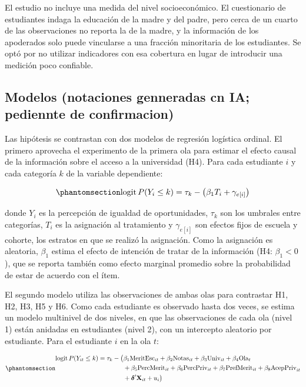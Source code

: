 \documentclass[
  spanish,
  a4paper,
  oneside]{scrbook}
\begin{document}
El estudio no incluye una medida del nivel socioeconómico. El
cuestionario de estudiantes indaga la educación de la madre y del padre,
pero cerca de un cuarto de las observaciones no reporta la de la madre,
y la información de los apoderados solo puede vincularse a una fracción
minoritaria de los estudiantes. Se optó por no utilizar indicadores con
esa cobertura en lugar de introducir una medición poco confiable.

\subsection{Modelos (notaciones genneradas cn IA; pediennte de
confirmacion)}\label{modelos-notaciones-genneradas-cn-ia-pediennte-de-confirmacion}

Las hipótesis se contrastan con dos modelos de regresión logística
ordinal. El primero aprovecha el experimento de la primera ola para
estimar el efecto causal de la información sobre el acceso a la
universidad (H4). Para cada estudiante \(i\) y cada categoría \(k\) de
la variable dependiente:

\begin{equation}\protect\phantomsection\label{eq-modelo1}{
\text{logit}\,P(Y_i \le k) = \tau_k - \left(\beta_1 T_i + \gamma_{e[i]}\right)
}\end{equation}

donde \(Y_i\) es la percepción de igualdad de oportunidades, \(\tau_k\)
son los umbrales entre categorías, \(T_i\) es la asignación al
tratamiento y \(\gamma_{e[i]}\) son efectos fijos de escuela y cohorte,
los estratos en que se realizó la asignación. Como la asignación es
aleatoria, \(\beta_1\) estima el efecto de intención de tratar de la
información (H4: \(\beta_1 < 0\)), que se reporta también como efecto
marginal promedio sobre la probabilidad de estar de acuerdo con el ítem.

El segundo modelo utiliza las observaciones de ambas olas para
contrastar H1, H2, H3, H5 y H6. Como cada estudiante es observado hasta
dos veces, se estima un modelo multinivel de dos niveles, en que las
observaciones de cada ola (nivel 1) están anidadas en estudiantes (nivel
2), con un intercepto aleatorio por estudiante. Para el estudiante \(i\)
en la ola \(t\):

\begin{equation}\protect\phantomsection\label{eq-modelo2}{
\begin{aligned}
\text{logit}\,P(Y_{it} \le k) = \tau_k - \big(&\beta_1 \text{MeritEsc}_{it} + \beta_2 \text{Notas}_{it} + \beta_3 \text{Univ}_{it} + \beta_4 \text{Ola}_t \\
&+ \beta_5 \text{PercMerit}_{it} + \beta_6 \text{PercPriv}_{it} + \beta_7 \text{PrefMerit}_{it} + \beta_8 \text{AcepPriv}_{it} \\
&+ \boldsymbol{\delta}'\mathbf{X}_{it} + u_i\big)
\end{aligned}
}\end{equation}
\end{document}
